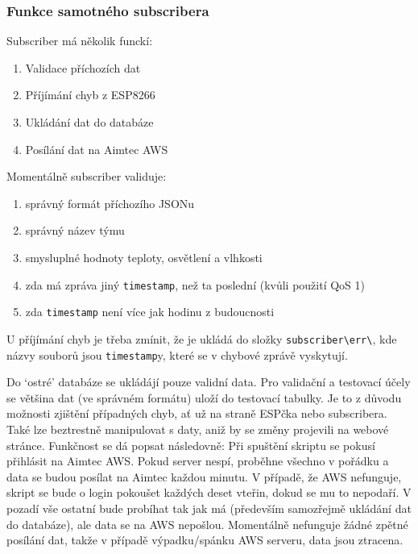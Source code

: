 \subsubsection{Funkce samotného subscribera}
Subscriber má několik funckí:
\begin{enumerate}
    \item Validace příchozích dat
    \item Příjímání chyb z ESP8266
    \item Ukládání dat do databáze
    \item Posílání dat na Aimtec AWS
\end{enumerate}
Momentálně subscriber validuje:
\begin{enumerate}
    \item správný formát příchozího JSONu
    \item správný název týmu
    \item smysluplné hodnoty teploty, osvětlení a vlhkosti
    \item zda má zpráva jiný \verb|timestamp|, než ta poslední (kvůli použití QoS 1)
    \item zda \verb|timestamp| není více jak hodinu z budoucnosti
\end{enumerate}
U příjímání chyb je třeba zmínit, že je ukládá do složky \verb|subscriber\err\|, kde názvy souborů jsou \verb|timestamp|y, které se v chybové zprávě vyskytují.

Do `ostré' databáze se ukládájí pouze validní data. Pro validační a testovací účely se většina dat (ve správném formátu) uloží do testovací tabulky.
Je to z důvodu možnosti zjištění případných chyb, ať už na straně ESPčka nebo subscribera. Také lze beztrestně manipulovat s daty, aniž by se změny projevili na webové stránce.
Funkčnost se dá popsat následovně:
Při spuštění skriptu se pokusí přihlásit na Aimtec AWS. Pokud server nespí, proběhne všechno v pořádku a data se budou posílat na Aimtec každou minutu.
V případě, že AWS nefunguje, skript se bude o login pokoušet každých deset vteřin, dokud se mu to nepodaří. V pozadí vše ostatní bude probíhat tak jak má (především samozřejmě ukládání dat do databáze), ale data se na AWS nepošlou. 
Momentálně nefunguje žádné zpětné posílání dat, takže v případě výpadku/spánku AWS serveru, data jsou ztracena.  